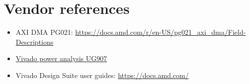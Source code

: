 \documentclass[10pt]{article}
\begin{document}
\section{Vendor references}

\begin{sloppypar}
\begin{itemize}
  \item AXI DMA PG021: \url{https://docs.amd.com/r/en-US/pg021_axi_dma/Field-Descriptions}
  \item \href{https://docs.amd.com/r/en-US/ug907-vivado-power-analysis-optimization}{Vivado power analysis UG907}
  \item Vivado Design Suite user guides: \url{https://docs.amd.com/}
\end{itemize}
\end{sloppypar}
\end{document}

